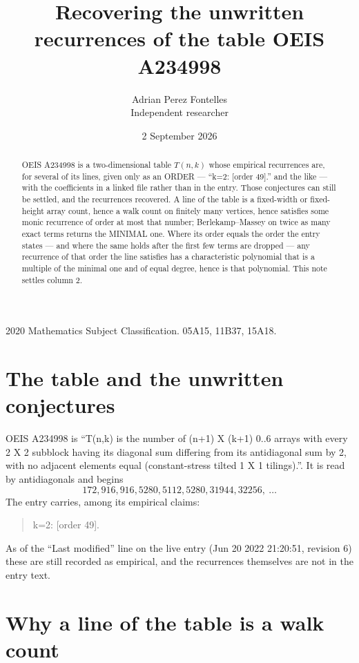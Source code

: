 \documentclass[11pt,a4paper]{article}
\title{Recovering the unwritten recurrences of the table OEIS A234998}
\author{Adrian Perez Fontelles\\ \small Independent researcher}
\date{2 September 2026}
\theoremstyle{plain}
\theoremstyle{definition}
\begin{document}
\maketitle

\begin{abstract}
OEIS A234998 is a two-dimensional table $T(n,k)$ whose empirical recurrences are, for several of
its lines, given only as an ORDER --- ``k=2: [order 49].'' and the like --- with the
coefficients in a linked file rather than in the entry. Those conjectures can still be settled,
and the recurrences recovered. A line of the table is a fixed-width or fixed-height array
count, hence a walk count on finitely many vertices, hence satisfies some monic recurrence of
order at most that number; Berlekamp--Massey on twice as many exact terms returns the MINIMAL
one. Where its order equals the order the entry states --- and where the same holds after the
first few terms are dropped --- any recurrence of that order the line satisfies has a
characteristic polynomial that is a multiple of the minimal one and of equal degree, hence is
that polynomial. This note settles column 2.
\end{abstract}

\noindent\small 2020 Mathematics Subject Classification. 05A15, 11B37, 15A18.\normalsize

\section{The table and the unwritten conjectures}

OEIS A234998 is ``T(n,k) is the number of (n+1) X (k+1) 0..6 arrays with every 2 X 2 subblock having its diagonal sum differing from its antidiagonal sum by 2, with no adjacent elements equal (constant-stress tilted 1 X 1 tilings).''. It is read by antidiagonals and begins
\[
172, 916, 916, 5280, 5112, 5280, 31944, 32256,\ \dots
\]
The entry carries, among its empirical claims:
\begin{quote}\small
k=2: [order 49].
\end{quote}
As of the ``Last modified'' line on the live entry (Jun 20 2022 21:20:51, revision 6) these are still
recorded as empirical, and the recurrences themselves are not in the entry text.

\section{Why a line of the table is a walk count}
\end{document}
